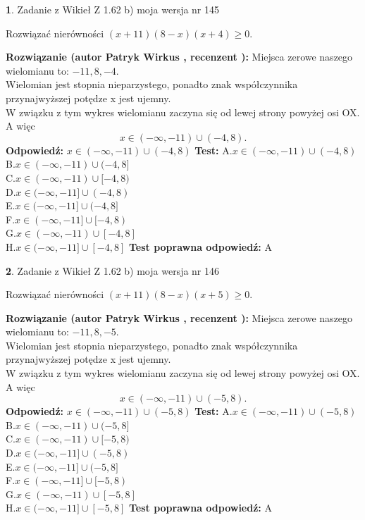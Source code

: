\documentclass[12pt, a4paper]{article}
\theoremstyle{definition} %
\newtheorem{zad}{}
\newcommand{\zadStart}[1]{\begin{zad}#1\newline}
\newcommand{\zadStop}{\end{zad}}
\newcommand{\rozwStart}[2]{\noindent \textbf{Rozwiązanie (autor #1 , recenzent #2): }\newline}
\newcommand{\rozwStop}{\newline}
\newcommand{\odpStart}{\noindent \textbf{Odpowiedź:}\newline}
\newcommand{\odpStop}{\newline}
\newcommand{\testStart}{\noindent \textbf{Test:}\newline}
\newcommand{\testStop}{\newline}
\newcommand{\kluczStart}{\noindent \textbf{Test poprawna odpowiedź:}\newline}
\newcommand{\kluczStop}{\newline}
\begin{document}
\zadStart{Zadanie z Wikieł Z 1.62 b) moja wersja nr 145}

Rozwiązać nierówności $(x+11)(8-x)(x+4)\ge0$.
\zadStop
\rozwStart{Patryk Wirkus}{}
Miejsca zerowe naszego wielomianu to: $-11, 8, -4$.\\
Wielomian jest stopnia nieparzystego, ponadto znak współczynnika przy\linebreak najwyższej potędze x jest ujemny.\\ W związku z tym wykres wielomianu zaczyna się od lewej strony powyżej osi OX. A więc $$x \in (-\infty,-11) \cup (-4,8).$$
\rozwStop
\odpStart
$x \in (-\infty,-11) \cup (-4,8)$
\odpStop
\testStart
A.$x \in (-\infty,-11) \cup (-4,8)$\\
B.$x \in (-\infty,-11) \cup (-4,8]$\\
C.$x \in (-\infty,-11) \cup [-4,8)$\\
D.$x \in (-\infty,-11] \cup (-4,8)$\\
E.$x \in (-\infty,-11] \cup (-4,8]$\\
F.$x \in (-\infty,-11] \cup [-4,8)$\\
G.$x \in (-\infty,-11) \cup [-4,8]$\\
H.$x \in (-\infty,-11] \cup [-4,8]$
\testStop
\kluczStart
A
\kluczStop



\zadStart{Zadanie z Wikieł Z 1.62 b) moja wersja nr 146}

Rozwiązać nierówności $(x+11)(8-x)(x+5)\ge0$.
\zadStop
\rozwStart{Patryk Wirkus}{}
Miejsca zerowe naszego wielomianu to: $-11, 8, -5$.\\
Wielomian jest stopnia nieparzystego, ponadto znak współczynnika przy\linebreak najwyższej potędze x jest ujemny.\\ W związku z tym wykres wielomianu zaczyna się od lewej strony powyżej osi OX. A więc $$x \in (-\infty,-11) \cup (-5,8).$$
\rozwStop
\odpStart
$x \in (-\infty,-11) \cup (-5,8)$
\odpStop
\testStart
A.$x \in (-\infty,-11) \cup (-5,8)$\\
B.$x \in (-\infty,-11) \cup (-5,8]$\\
C.$x \in (-\infty,-11) \cup [-5,8)$\\
D.$x \in (-\infty,-11] \cup (-5,8)$\\
E.$x \in (-\infty,-11] \cup (-5,8]$\\
F.$x \in (-\infty,-11] \cup [-5,8)$\\
G.$x \in (-\infty,-11) \cup [-5,8]$\\
H.$x \in (-\infty,-11] \cup [-5,8]$
\testStop
\kluczStart
A
\kluczStop
\end{document}
